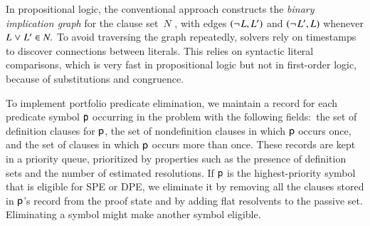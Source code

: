 

In propositional logic, the conventional approach constructs the
\emph{binary implication graph} for the clause set~$N$
\cite{hjb-2011-big-simplification}, with edges $(\neg{\kern.2ex L}, L')$ and
$(\neg{\kern.2ex L'}, L)$ whenever $L \mathrel{\lor} L' \in N.$ To avoid traversing the graph
repeatedly, solvers rely on timestamps to discover connections between
literals. This relies on syntactic literal comparisons, which is very
fast in propositional logic but not in first-order logic, because of
substitutions and congruence.

% 
To implement portfolio predicate elimination, we maintain a record for each
predicate symbol $\mathsf{p}$ occurring in the problem with the
following fields:\
the set of definition clauses for $\mathsf{p}$, the set of nondefinition clauses in which
$\mathsf{p}$ occurs once, and the set of clauses in which $\mathsf{p}$ occurs more than
once. These records are kept in a priority queue, prioritized by properties such
as the presence of definition sets and the number of estimated resolutions. If
$\mathsf{p}$ is the highest-priority symbol that is eligible for SPE or DPE, we
eliminate it by removing all the clauses stored in $\mathsf{p}$'s record from the
proof state and by adding flat resolvents to the passive set.
Eliminating a symbol might make another symbol eligible.


